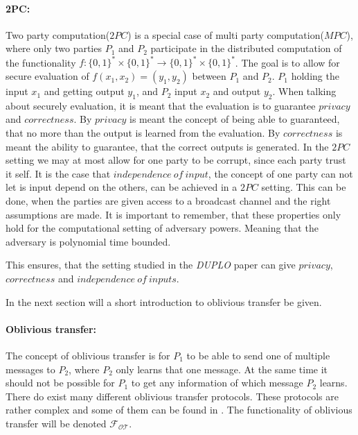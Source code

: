 \documentclass[twoside,11pt,openright]{report}
\newcommand{\DUPLO}{\textit{DUPLO} }
\begin{document}
\paragraph{2PC:}
Two party computation($2PC$) is a special case of multi party computation($MPC$), where only two parties $P_1$ and $P_2$ participate in the distributed computation of the functionality $f: \{0,1\}^* \times \{0,1\}^* \to \{0,1\}^* \times \{0,1\}^*$. The goal is to allow for secure evaluation of $f(x_1,x_2)=(y_1,y_2)$ between $P_1$ and $P_2$. $P_1$ holding the input $x_1$ and getting output $y_1$, and $P_2$ input $x_2$ and output $y_2$. When talking about securely evaluation, it is meant that the evaluation is to guarantee $privacy$ and $correctness$. By $privacy$ is meant the concept of being able to guaranteed, that no more than the output is learned from the evaluation. By $correctness$ is meant the ability to guarantee, that the correct outputs is generated. In the $2PC$ setting we may at most allow for one party to be corrupt, since each party trust it self. It is the case that $independence~of~input$, the concept of one party can not let is input depend on the others, can be achieved in a $2PC$ setting. This can be done, when the parties are given access to a broadcast channel and the right assumptions are made. It is important to remember, that these properties only hold for the computational setting of adversary powers. Meaning that the adversary is polynomial time bounded.

This ensures, that the setting studied in the \DUPLO paper can give $privacy$, $correctness$ and $independence~of~inputs$.

\bigskip

In the next section will a short introduction to oblivious transfer be given.

\paragraph{Oblivious transfer:}
The concept of oblivious transfer is for $P_1$ to be able to send one of multiple messages to $P_2$, where $P_2$ only learns that one message. At the same time it should not be possible for $P_1$ to get any information of which message $P_2$ learns. There do exist many different oblivious transfer protocols. These protocols are rather complex and some of them can be found in \cite{estpp}. The functionality of oblivious transfer will be denoted $\mathcal{F_{OT}}$.

\bigskip
\end{document}
